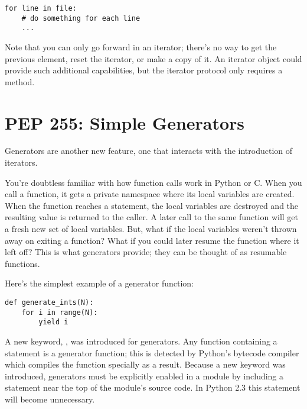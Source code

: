 \documentclass{howto}
\begin{document}
\begin{verbatim}
for line in file:
    # do something for each line
    ...
\end{verbatim}

Note that you can only go forward in an iterator; there's no way to
get the previous element, reset the iterator, or make a copy of it.
An iterator object could provide such additional capabilities, but the
iterator protocol only requires a  method.

\begin{seealso}


\end{seealso}


\section{PEP 255: Simple Generators}

Generators are another new feature, one that interacts with the
introduction of iterators.

You're doubtless familiar with how function calls work in Python or
C.  When you call a function, it gets a private namespace where its local
variables are created.  When the function reaches a 
statement, the local variables are destroyed and the resulting value
is returned to the caller.  A later call to the same function will get
a fresh new set of local variables.  But, what if the local variables
weren't thrown away on exiting a function?  What if you could later
resume the function where it left off?  This is what generators
provide; they can be thought of as resumable functions.

Here's the simplest example of a generator function:

\begin{verbatim}
def generate_ints(N):
    for i in range(N):
        yield i
\end{verbatim}

A new keyword, , was introduced for generators.  Any
function containing a  statement is a generator
function; this is detected by Python's bytecode compiler which
compiles the function specially as a result.  Because a new keyword was
introduced, generators must be explicitly enabled in a module by
including a  statement near
the top of the module's source code.  In Python 2.3 this statement
will become unnecessary.
\end{document}
